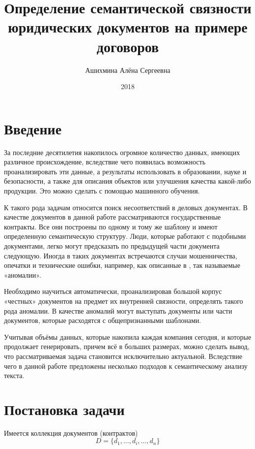 \documentclass[12pt]{article}
\author{Ашихмина Алёна Сергеевна}
\title{Определение семантической связности юридических документов на примере договоров}
\date{2018}
\begin{document}
\maketitle{}

\topmargin=-1cm
\setlength{\textheight}{20,8cm}
\setlength{\textwidth}{16.5cm}
\hoffset=-5mm
\voffset=10mm
\parindent=12mm

\newpage
\tableofcontents
\newpage



\section{Введение}
За последние десятилетия накопилось огромное количество данных, имеющих различное происхождение, вследствие чего появилась возможность проанализировать эти данные, а результаты использовать в образовании, науке и безопасности, а также для описания объектов или улучшения качества какой-либо продукции. Это можно сделать с помощью машинного обучения. 

К такого рода задачам относится поиск несоответствий в деловых документах. В качестве документов в данной работе рассматриваются государственные контракты. Все они построены по одному и тому же шаблону и имеют определенную семантическую структуру. Люди, которые работают с подобными документами, легко могут предсказать по предыдущей части документа следующую. Иногда в таких документах встречаются случаи мошенничества, опечатки и технические ошибки, например, как описанные в \cite{vedomosti,fontanka}, так называемые «аномалии». 

Необходимо научиться автоматически, проанализировав большой корпус «честных» документов на предмет их внутренней связности, определять такого рода аномалии. В качестве аномалий могут выступать документы или части документов, которые расходятся с общепризнанными шаблонами.

Учитывая объёмы данных, которые накопила каждая компания сегодня, и которые продолжает генерировать, причем всё в больших размерах, можно сделать вывод, что рассматриваемая задача становится исключительно актуальной. Вследствие чего в данной работе предложены несколько подходов к семантическому анализу текста. 

\newpage
\section{Постановка задачи}
Имеется коллекция документов (контрактов) $$D = \{d_1,\ldots,d_i,\ldots,d_n\}$$
\end{document}
